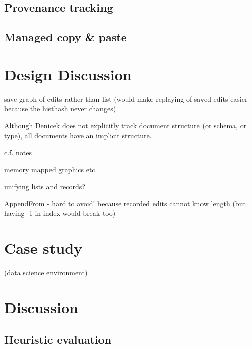 \documentclass[sigconf]{acmart}
\begin{document}
\subsection{Provenance tracking}
\label{sec:impl-provenance}

\subsection{Managed copy \& paste}
\label{sec:impl-copy}


\section{Design Discussion}
\label{sec:discuss}

save graph of edits rather than list
(would make replaying of saved edits easier because the histhash never changes)

Although Denicek does not explicitly track document structure (or schema, or type), all documents
have an implicit structure.

c.f. notes

memory mapped graphics etc.

unifying lists and records?

AppendFrom - hard to avoid! because recorded edits cannot know length
(but having -1 in index would break too)

\section{Case study}
\label{sec:case}
(data science environment)

\section{Discussion}
\subsection{Heuristic evaluation}
\end{document}
